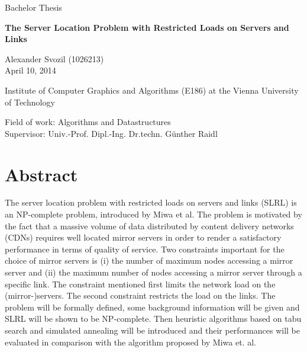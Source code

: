\documentclass [12pt]{article}
\begin{document}
\vspace{20pt}
\begin{center}
  \fontsize{45pt}{25pt}\selectfont Bachelor Thesis 
\end{center}
\vspace{50pt}
\begin{center}
  \fontsize{55pt}{30pt}\selectfont\textbf{The Server Location Problem with Restricted Loads on Servers and Links} 
\end{center}
\vspace{50pt}

\begin{center}
\large Alexander Svozil (1026213)\\April 10, 2014
\end{center}
\vspace{20pt}
\begin{center}
\large Institute of Computer Graphics and Algorithms (E186) at the Vienna University of Technology 
\end{center}
\vspace{20pt}
\begin{center}
\large Field of work: Algorithms and Datastructures \\ Supervisor: Univ.-Prof. Dipl.-Ing. Dr.techn. Günther Raidl \\
\end{center}
\thispagestyle{empty}
\newpage


\section*{Abstract}
The server location problem with restricted loads on servers and links (SLRL) is an NP-complete
problem, introduced by Miwa et al. The problem 
is motivated by the fact that a massive volume of data distributed by content delivery networks (CDNs) 
requires well located mirror servers in order to render a satisfactory performance in terms of quality of service.
Two constraints important for the choice of mirror servers is (i) the number of maximum nodes
accessing a mirror server and (ii) the maximum number of nodes accessing a mirror server 
through a specific link. The constraint mentioned first limits the network load on
the (mirror-)servers. The second constraint restricts the load on the links.
The problem will be formally defined, some background information will be given and SLRL will be shown to be NP-complete.
Then heuristic algorithms based on tabu search and simulated annealing will be introduced and their performances will be evaluated in comparison with the algorithm proposed 
by Miwa et. al. 
\end{document}
